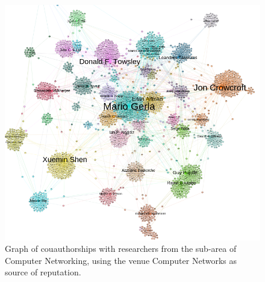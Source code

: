 \documentclass[msc]{ppgccufmg}
\begin{document}
\begin{appendices}
\begin{figure}[h]
    \centering
    \includegraphics[scale=0.45]{fig/cn}
    \caption{Graph of couauthorships with researchers from the sub-area of Computer Networking, using the venue Computer Networks as source of reputation.}
    \label{fig:cn}
\end{figure}



\end{appendices}
\end{document}
